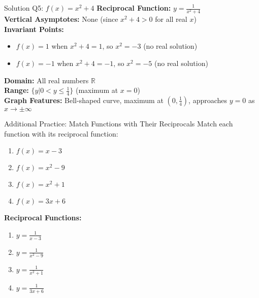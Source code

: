 \documentclass[aspectratio=169]{beamer}
\begin{document}
\begin{frame}{Solution Q5: $f(x) = x^2 + 4$}
    \footnotesize
    \textbf{Reciprocal Function:} $y = \frac{1}{x^2 + 4}$\\
    \vspace{0.5em}
    \textbf{Vertical Asymptotes:} None (since $x^2 + 4 > 0$ for all real $x$)\\
    \vspace{0.5em}
    \textbf{Invariant Points:}
    \begin{itemize}
        \item $f(x) = 1$ when $x^2 + 4 = 1$, so $x^2 = -3$ (no real solution)
        \item $f(x) = -1$ when $x^2 + 4 = -1$, so $x^2 = -5$ (no real solution)
    \end{itemize}
    \vspace{0.5em}
    \textbf{Domain:} All real numbers $\mathbb{R}$\\
    \textbf{Range:} $\{y | 0 < y \leq \frac{1}{4}\}$ (maximum at $x = 0$)\\
    \vspace{0.5em}
    \textbf{Graph Features:} Bell-shaped curve, maximum at $(0, \frac{1}{4})$, approaches $y = 0$ as $x \to \pm\infty$
\end{frame}

\begin{frame}{Additional Practice: Match Functions with Their Reciprocals}
    \footnotesize
    Match each function with its reciprocal function:
    \begin{enumerate}[label=Q\arabic*]
        \item $f(x) = x - 3$
        \item $f(x) = x^2 - 9$
        \item $f(x) = x^2 + 1$
        \item $f(x) = 3x + 6$
    \end{enumerate}
    \vspace{1em}
    \textbf{Reciprocal Functions:}
    \begin{enumerate}[label=A\alph*]
        \item $y = \frac{1}{x - 3}$
        \item $y = \frac{1}{x^2 - 9}$
        \item $y = \frac{1}{x^2 + 1}$
        \item $y = \frac{1}{3x + 6}$
    \end{enumerate}
\end{frame}
\end{document}
